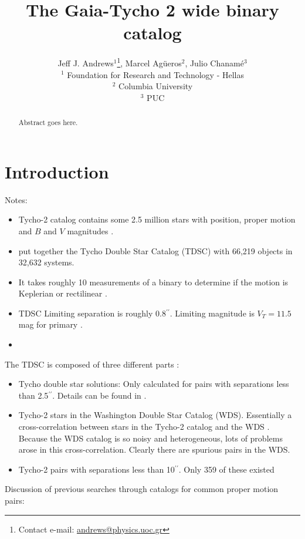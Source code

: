 \documentclass[usenatbib]{mnras}
\title[Gaia wide binaries]{The Gaia-Tycho 2 wide binary catalog}
\author[J. J. Andrews et al.]{Jeff J. Andrews$^{1}$\thanks{Contact e-mail: \href{mailto:andrews@physics.uoc.gr}{andrews@physics.uoc.gr}}, Marcel Ag\"{u}eros$^2$, Julio Chanam\'{e}$^3$ \\
$^1$ Foundation for Research and Technology - Hellas \\
$^2$ Columbia University \\
$^3$ PUC}
\newcommand{\asec}{\ifmmode {^{\prime\prime}}\else$^{\prime\prime}$\fi}
\begin{document}
\label{firstpage}
\pagerange{\pageref{firstpage}--\pageref{lastpage}}
\maketitle



\begin{abstract}
Abstract goes here.
\end{abstract}

\section{Introduction}

Notes:
\begin{itemize}
\item Tycho-2 catalog contains some 2.5 million stars with position, proper motion and $B$ and $V$ magnitudes \citep{hog00b}.
\item \citet{fabricius02} put together the Tycho Double Star Catalog (TDSC) with 66,219 objects in 32,632 systems.
\item It takes roughly 10 measurements of a binary to determine if the motion is Keplerian or rectilinear \citep{fabricius02}.\\
\item TDSC Limiting separation is roughly 0.8\asec. Limiting magnitude is $V_T=11.5$ mag for primary \citep{fabricius02}.
\item
\end{itemize}

The TDSC is composed of three different parts \citep{fabricius02}:
\begin{itemize}
\item Tycho double star solutions: Only calculated for pairs with separations less than 2.5\asec. Details can be found in \citet{hog00a}.\\
\item Tycho-2 stars in the Washington Double Star Catalog (WDS). Essentially a cross-correlation between stars in the Tycho-2 catalog and the WDS \citep{mason00}. Because the WDS catalog is so noisy and heterogeneous, lots of problems arose in this cross-correlation. Clearly there are spurious pairs in the WDS. \\
\item Tycho-2 pairs with separations less than 10\asec. Only 359 of these existed
\end{itemize}

Discussion of previous searches through catalogs for common proper motion pairs:
\end{document}
